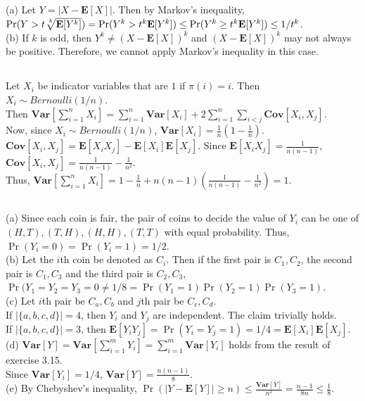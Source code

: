 \documentclass{article}
\begin{document}
\subsection{}
(a) Let $Y=|X-\textbf{E}[X]|$. Then by Markov's inequality,\\
$\Pr(Y>t\sqrt[\leftroot{-2}\uproot{2}k]{\textbf{E}[Y^k]}) =\Pr(Y^k > t^k\textbf{E}[Y^k]) \leq \Pr(Y^k \geq t^k\textbf{E}[Y^k])\leq1/t^k$.\\
(b) If $k$ is odd, then $Y^k \neq (X-\textbf{E}[X])^k$ and $(X-\textbf{E}[X])^k$ may not always be positive.
Therefore, we cannot apply Markov's inequality in this case.
\subsection{}
Let $X_i$ be indicator variables that are $1$ if $\pi(i)=i$. Then $X_i\sim Bernoulli(1/n)$.\\
Then $\textbf{Var}[\sum\limits_{i=1}^nX_i]=\sum\limits_{i=1}^n\textbf{Var}[X_i]+2\sum\limits_{i=1}^n\sum\limits_{i<j}\textbf{Cov}[X_i,X_j]$.\\
Now, since $X_i\sim Bernoulli(1/n)$, $\textbf{Var}[X_i]=\frac{1}{n}\left(1-\frac{1}{n}\right)$.\\
$\textbf{Cov}[X_i,X_j]=\textbf{E}[X_iX_j]-\textbf{E}[X_i]\textbf{E}[X_j]$. Since $\textbf{E}[X_iX_j]=\frac{1}{n(n-1)}$, $\textbf{Cov}[X_i,X_j]=\frac{1}{n(n-1)}-\frac{1}{n^2}$.\\
Thus, $\textbf{Var}[\sum\limits_{i=1}^nX_i]=1-\frac{1}{n}+n(n-1)\left(\frac{1}{n(n-1)}-\frac{1}{n^2}\right)=1$.
\subsection{}
(a) Since each coin is fair, the pair of coins to decide the value of $Y_i$ can be one of $(H,T),(T,H),(H,H),(T,T)$ with equal probability. Thus, $\Pr(Y_i=0)=\Pr(Y_i=1)=1/2$.\\
(b) Let the $i$th coin be denoted as $C_i$.
Then if the first pair is $C_1,C_2$, the second pair is $C_1,C_3$ and the third pair is $C_2,C_3$,\\
$\Pr(Y_1=Y_2=Y_3=0\neq1/8=\Pr(Y_1=1)\Pr(Y_2=1)\Pr(Y_3=1)$.\\
(c) Let $i$th pair be $C_a,C_b$ and $j$th pair be $C_c,C_d$.\\
If $|\{a,b,c,d\}|=4$, then $Y_i$ and $Y_j$ are independent. The claim trivially holds.\\
If $|\{a,b,c,d\}|=3$, then $\textbf{E}[Y_iY_j]=\Pr(Y_i=Y_j=1)=1/4=\textbf{E}[X_i]\textbf{E}[X_j]$.\\
(d) $\textbf{Var}[Y]=\textbf{Var}[\sum\limits_{i=1}^mY_i]=\sum\limits_{i=1}^m\textbf{Var}[Y_i]$ holds from the result of exercise 3.15.\\
Since $\textbf{Var}[Y_i]=1/4$, $\textbf{Var}[Y]=\frac{n(n-1)}{8}$.\\
(e) By Chebyshev's inequality, $\Pr(|Y-\textbf{E}[Y]| \geq n) \leq \frac{\textbf{Var}[Y]}{n^2}=\frac{n-1}{8n}\leq\frac{1}{8}$.
\end{document}
